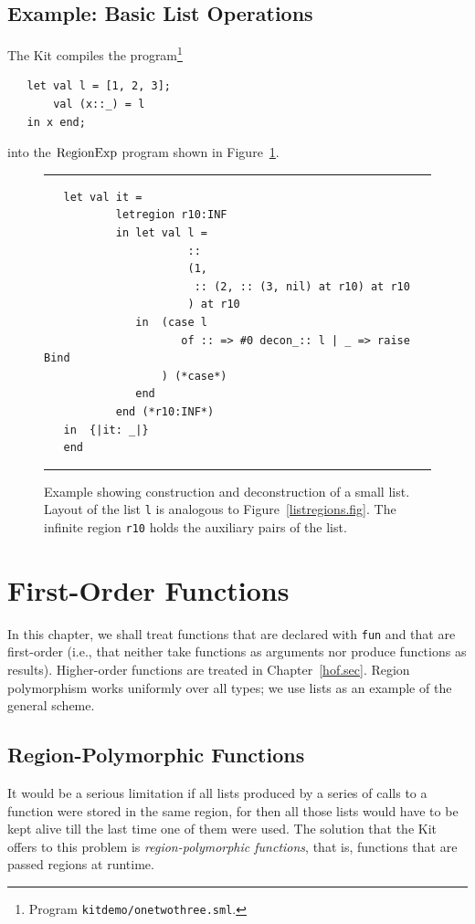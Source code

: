 \documentclass[12pt]{book}
\begin{document}
\section{Example: Basic List Operations}
\label{listexamples.sec}
The Kit compiles the program\footnote{Program \texttt{kitdemo/onetwothree.sml}.}  
\begin{verbatim}
   let val l = [1, 2, 3];
       val (x::_) = l
   in x end;
\end{verbatim}       
into the $\hbox{\rm RegionExp}$ program shown in Figure~\ref{listprint.fig}.
\begin{figure}
\hrule \medskip
\begin{verbatim}
   let val it = 
           letregion r10:INF 
           in let val l = 
                      :: 
                      (1, 
                       :: (2, :: (3, nil) at r10) at r10
                      ) at r10
              in  (case l 
                     of :: => #0 decon_:: l | _ => raise Bind
                  ) (*case*) 
              end  
           end (*r10:INF*)
   in  {|it: _|}
   end 
\end{verbatim}
\caption{Example showing construction and deconstruction of a small list.
Layout of the list {\tt l} is analogous to Figure~\ref{listregions.fig}.
The infinite region {\tt r10} holds the auxiliary pairs of the list.
}
\label{listprint.fig}
\medskip

\hrule
\end{figure}


\chapter{First-Order Functions}
In this chapter, we shall treat
%
%
functions that are declared with 
{\tt fun} and that are first-order (i.e., that neither take functions
as arguments nor produce functions as results). Higher-order functions
are treated in Chapter~\ref{hof.sec}.  Region polymorphism works
uniformly over all types; we use lists as an example of the general
scheme.

\section{Region-Polymorphic Functions}
%
It would be a serious limitation if all lists produced by a series of
calls to a function were stored in the same region, for then all those
lists would have to be kept alive till the last time one of them were
used. The solution that the Kit offers to this problem is {\em
  region-polymorphic functions}, that is, functions that are passed
regions at runtime.
\end{document}
